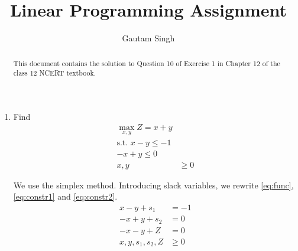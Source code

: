 \documentclass[journal,12pt,twocolumn]{IEEEtran}
\begin{document}
\vspace{3cm}
\title{Linear Programming Assignment}
\author{Gautam Singh}
\maketitle
\bigskip

\begin{abstract}
    This document contains the solution to Question 10 of 
    Exercise 1 in Chapter 12 of the class 12 NCERT textbook.
\end{abstract}

\begin{enumerate}
    \item Find 
    \begin{align}
        \max_{x,y}Z = x + y \label{eq:func} \\
        \textrm{s.t. } x - y \le -1 \label{eq:constr1} \\
        -x + y \le 0 \label{eq:constr2} \\
        x, y &\ge 0
    \end{align}

    \solution We use the simplex method. Introducing slack variables,
    we rewrite \eqref{eq:func}, \eqref{eq:constr1} and \eqref{eq:constr2}.
    \begin{align}
        x - y + s_1 &= -1 \\
        -x + y + s_2 &= 0 \\
        -x - y + Z &= 0 \\
        x, y, s_1, s_2, Z &\ge 0
    \end{align}


\end{enumerate}
\end{document}
